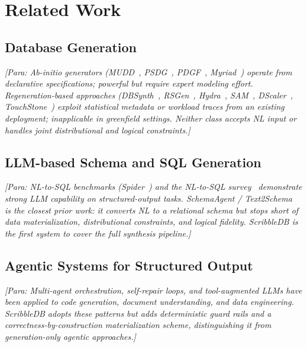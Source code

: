 \section{Related Work}

\subsection{Database Generation}
\textit{[Para: Ab-initio generators (MUDD~\cite{stephens2004mudd}, PSDG~\cite{hoag2007psdg},
PDGF~\cite{rabl2010pdgf}, Myriad~\cite{alexandrov2012myriad}) operate from declarative
specifications; powerful but require expert modeling effort.
Regeneration-based approaches (DBSynth~\cite{rabl2015dbsynth}, RSGen~\cite{shen2013rsgen},
Hydra~\cite{sanghi2018hydra}, SAM~\cite{yang2022sam}, DScaler~\cite{zhang2016dscaler},
TouchStone~\cite{wang2023scalable}) exploit statistical metadata or workload traces from an
existing deployment; inapplicable in greenfield settings.
Neither class accepts NL input or handles joint distributional and logical constraints.]}

\subsection{LLM-based Schema and SQL Generation}
\textit{[Para: NL-to-SQL benchmarks (Spider~\cite{yu2019spider}) and the NL-to-SQL
survey~\cite{luo2025nl2sql} demonstrate strong LLM capability on structured-output tasks.
SchemaAgent / Text2Schema~\cite{wang2025text2schema} is the closest prior work:
it converts NL to a relational schema but stops short of data materialization, distributional
constraints, and logical fidelity.
ScribbleDB is the first system to cover the full synthesis pipeline.]}

\subsection{Agentic Systems for Structured Output}
\textit{[Para: Multi-agent orchestration, self-repair loops, and tool-augmented LLMs have been
applied to code generation, document understanding, and data engineering.
ScribbleDB adopts these patterns but adds deterministic guard rails and a correctness-by-construction
materialization scheme, distinguishing it from generation-only agentic approaches.]}

